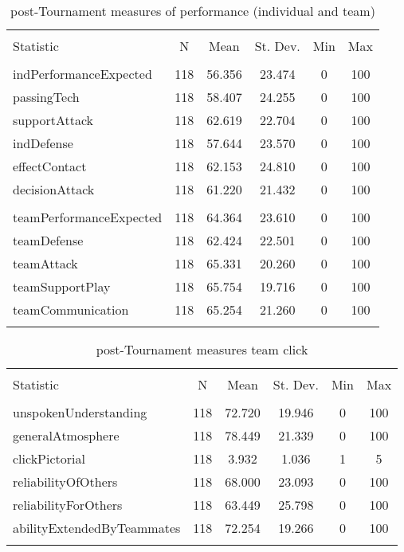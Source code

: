 \documentclass[12pt]{report}
\begin{document}
\begin{table}[!htbp] \centering
  \caption{post-Tournament measures of performance (individual and team)}
  \label{}
\begin{tabular}{@{\extracolsep{5pt}}lccccc}
\\[-1.8ex]\hline
\hline \\[-1.8ex]
Statistic & \multicolumn{1}{c}{N} & \multicolumn{1}{c}{Mean} & \multicolumn{1}{c}{St. Dev.} & \multicolumn{1}{c}{Min} & \multicolumn{1}{c}{Max} \\
\hline \\[-1.8ex]
indPerformanceExpected & 118 & 56.356 & 23.474 & 0 & 100 \\
passingTech & 118 & 58.407 & 24.255 & 0 & 100 \\
supportAttack & 118 & 62.619 & 22.704 & 0 & 100 \\
indDefense & 118 & 57.644 & 23.570 & 0 & 100 \\
effectContact & 118 & 62.153 & 24.810 & 0 & 100 \\
decisionAttack & 118 & 61.220 & 21.432 & 0 & 100 \\
\\
teamPerformanceExpected & 118 & 64.364 & 23.610 & 0 & 100 \\
teamDefense & 118 & 62.424 & 22.501 & 0 & 100 \\
teamAttack & 118 & 65.331 & 20.260 & 0 & 100 \\
teamSupportPlay & 118 & 65.754 & 19.716 & 0 & 100 \\
teamCommunication & 118 & 65.254 & 21.260 & 0 & 100 \\
\hline \\[-1.8ex]
\end{tabular}
\end{table}

\begin{table}[!htbp] \centering
  \caption{post-Tournament measures team click}
  \label{}
\begin{tabular}{@{\extracolsep{5pt}}lccccc}
\\[-1.8ex]\hline
\hline \\[-1.8ex]
Statistic & \multicolumn{1}{c}{N} & \multicolumn{1}{c}{Mean} & \multicolumn{1}{c}{St. Dev.} & \multicolumn{1}{c}{Min} & \multicolumn{1}{c}{Max} \\
\hline \\[-1.8ex]
unspokenUnderstanding & 118 & 72.720 & 19.946 & 0 & 100 \\
generalAtmosphere & 118 & 78.449 & 21.339 & 0 & 100 \\
clickPictorial & 118 & 3.932 & 1.036 & 1 & 5 \\
reliabilityOfOthers & 118 & 68.000 & 23.093 & 0 & 100 \\
reliabilityForOthers & 118 & 63.449 & 25.798 & 0 & 100 \\
abilityExtendedByTeammates & 118 & 72.254 & 19.266 & 0 & 100 \\
\hline \\[-1.8ex]
\end{tabular}
\end{table}
\end{document}
